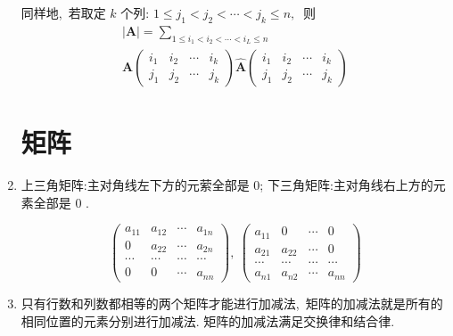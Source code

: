 \begin{enumerate}
		同样地,\  若取定 $ k $ 个列:  $1 \leqslant j_{1}<j_{2}<\cdots<j_{k} \leqslant n ,\ $ 则
		$$	\begin{array}{c}
			|\boldsymbol{A}|=\sum\limits_{1 \leqslant i_{1}<i_{2}<\cdots<i_{L} \leqslant n} \\
			\boldsymbol{A}\left(\begin{array}{llll}
				i_{1} & i_{2} & \cdots & i_{k} \\
				j_{1} & j_{2} & \cdots & j_{k}
			\end{array}\right) \hat{\boldsymbol{A}}\left(\begin{array}{llll}
				i_{1} & i_{2} & \cdots & i_{k} \\
				j_{1} & j_{2} & \cdots & j_{k}
			\end{array}\right)
		\end{array}$$
		
		\section{矩阵}
		\item 上三角矩阵:主对角线左下方的元萦全部是 0;
		下三角矩阵:主对角线右上方的元素全部是 0 .
		
		$$\left(\begin{array}{cccc}
			a_{11} & a_{12} & \cdots & a_{1 n} \\
			0 & a_{22} & \cdots & a_{2 n} \\
			\cdots & \cdots & \cdots & \cdots \\
			0 & 0 & \cdots & a_{n n}
		\end{array}\right),\ \left(\begin{array}{cccc}
			a_{11} & 0 & \cdots & 0 \\
			a_{21} & a_{22} & \cdots & 0 \\
			\cdots & \cdots & \cdots & \cdots \\
			a_{n 1} & a_{n 2} & \cdots & a_{n n}
		\end{array}\right)$$
		
		\item 只有行数和列数都相等的两个矩阵才能进行加减法,\  矩阵的加减法就是所有的相同位置的元素分别进行加减法. 矩阵的加减法满足交换律和结合律.	
		

\end{enumerate}
